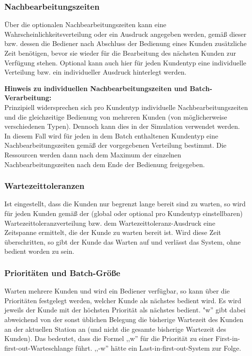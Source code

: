\subsubsection*{Nachbearbeitungszeiten}

Über die optionalen Nachbearbeitungszeiten kann eine Wahrscheinlichkeitsverteilung oder ein Ausdruck angegeben werden, gemäß
dieser bzw. dessen die Bediener nach Abschluss der Bedienung eines Kunden zusätzliche Zeit benötigen, bevor sie wieder für
die Bearbeitung des nächsten Kunden zur Verfügung stehen. Optional kann auch hier für jeden Kundentyp eine individuelle Verteilung
bzw. ein individueller Ausdruck hinterlegt werden.

\textbf{Hinweis zu individuellen Nachbearbeitungszeiten und Batch-Verarbeitung:}~\\
Prinzipiell widersprechen sich pro Kundentyp individuelle Nachbearbeitungszeiten und die gleichzeitige Bedienung von mehreren Kunden
(von möglicherweise verschiedenen Typen). Dennoch kann dies in der Simulation verwendet werden. In diesem Fall wird für jeden
in dem Batch enthaltenen Kundentyp eine Nachbearbeitungszeiten gemäß der vorgegebenen Verteilung bestimmt. Die Ressourcen werden
dann nach dem Maximum der einzelnen Nachbearbeitungszeiten nach dem Ende der Bedienung freigegeben.

\subsubsection*{Wartezeittoleranzen}

Ist eingestellt, dass die Kunden nur begrenzt lange bereit sind zu warten, so wird für jeden Kunden gemäß der (global oder optional
pro Kundentyp einstellbaren) Wartezeittoleranzverteilung bzw. dem Wartezeittoleranz-Ausdruck eine Zeitspanne ermittelt, die der
Kunde zu warten bereit ist. Wird diese Zeit überschritten, so gibt der Kunde das Warten auf und verlässt das System,
ohne bedient worden zu sein.

\subsubsection*{Prioritäten und Batch-Größe}

Warten mehrere Kunden und wird ein Bediener verfügbar, so kann über die Prioritäten festgelegt werden, welcher Kunde als nächstes
bedient wird. Es wird jeweils der Kunde mit der höchsten Priorität als nächstes bedient.
"w'' gibt dabei abweichend von der sonst üblichen Belegung die bisherige Wartezeit des Kunden an der aktuellen Station an (und nicht
die gesamte bisherige Wartezeit des Kunden). Das bedeutet, dass die Formel ,,w'' für die Priorität zu einer
First-in-first-out-Warteschlange führt. ,,-w'' hätte ein Last-in-first-out-System zur Folge.

